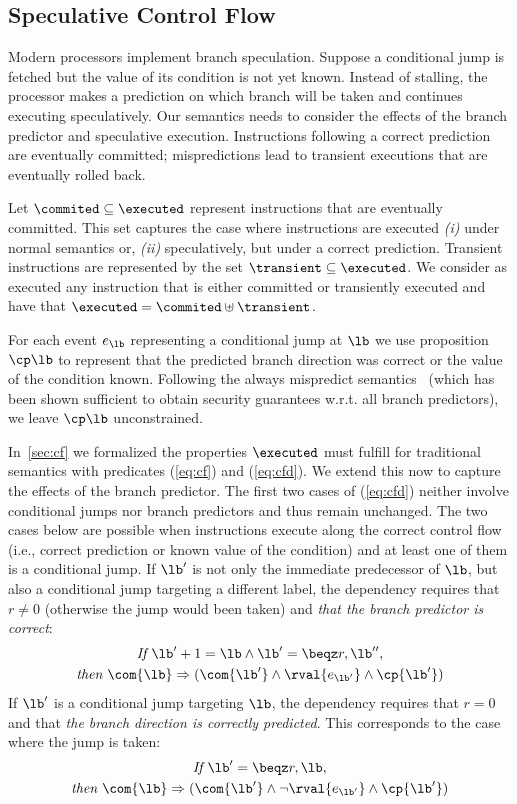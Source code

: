 \documentclass[conference]{IEEEtran}
\begin{document}
\subsection{Speculative Control Flow}
\label{sec:scf}

Modern processors implement branch speculation. 
Suppose a conditional jump is fetched  but the value of its condition is not yet known.
Instead of stalling, the processor makes a prediction on which branch will be taken and continues executing speculatively.
Our semantics needs to consider the effects of the branch predictor and speculative execution.
Instructions following a correct prediction are eventually committed; mispredictions lead to transient executions that are eventually rolled back.

Let $\commited \subseteq \executed$ represent instructions that are eventually committed.
This set captures the case where instructions are executed \emph{(i)} under normal semantics or, \emph{(ii)} speculatively, but under a correct prediction.
Transient instructions are represented by the set $\transient \subseteq \executed$.
We consider as executed any instruction that is either committed or transiently executed and have that
$\executed = \commited \uplus \transient$.

For each event $e_\lb$ representing a conditional jump at $\lb$ we use proposition $\cp \lb$ to represent that the predicted branch direction was correct or the value of the condition known. 
Following the always mispredict semantics~\cite{GuarnieriKMRS20} (which has been shown sufficient to obtain security guarantees w.r.t. all branch predictors), we leave $\cp \lb$ unconstrained.

In~\autoref{sec:cf} we formalized the properties $\executed$ must fulfill for traditional semantics with predicates (\ref{eq:cf}) and (\ref{eq:cfd}).
We extend this now to capture the effects of the branch predictor.
The first two cases of (\ref{eq:cfd}) neither involve conditional jumps nor branch predictors and thus remain unchanged.
The two cases below are possible when instructions execute along the correct control flow (i.e., correct prediction or known value of the condition) and at least one of them is a conditional jump.
  If $\lb'$ is not only the immediate predecessor of $\lb$, but also a conditional jump targeting a different label, the dependency requires that $r \neq 0$ (otherwise the jump would been taken) and \emph{that the branch predictor is correct}:
  \begin{gather*}
  \textit{If }\lb'+1 = \lb \land \lb' = \beqz r,\lb'',\\
  \textit{then } \com{\lb} \Rightarrow ({\com{\lb'} \land \rval{e_{\lb'}}} \land \cp{\lb'})
  \end{gather*}
  If $\lb'$ is a conditional jump targeting $\lb$, the dependency requires that $r = 0$ and that \emph{the branch direction is correctly predicted}. This corresponds to the case where the jump is taken:
  \begin{gather*}
  \textit{If }\lb' = \beqz r,\lb,\\
  \textit{then } \com{\lb} \Rightarrow ({\com{\lb'} \land {\neg \rval{e_{\lb'}}}} \land \cp{\lb'})
  \end{gather*}
\end{document}
